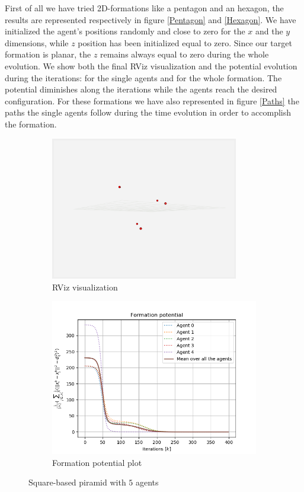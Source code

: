 \documentclass[a4paper,11pt,oneside]{book}
\begin{document}
First of all we have tried 2D-formations like a pentagon and an hexagon, the results are represented respectively in figure \ref{Pentagon} and \ref{Hexagon}. We have initialized the agent's positions randomly and close to zero for the $x$ and the $y$ dimensions, while $z$ position has been initialized equal to zero. Since our target formation is planar, the $z$ remains always equal to zero during the whole evolution.
We show both the final RViz visualization and the potential evolution during the iterations: for the single agents and for the whole formation. The potential diminishes along the iterations while the agents reach the desired configuration. 
For these formations we have also represented in figure \ref{Paths} the paths the single agents follow during the time evolution in order to accomplish the formation.

\begin{figure}
\centering
	\begin{subfigure}{0.49\textwidth}	
	\includegraphics[width=0.9\textwidth]{Task-2.2_R-viz_No-Coll-Avoid_Piramid}
	\caption{RViz visualization}
	\end{subfigure}
\hfill
	\begin{subfigure}{0.49\textwidth}	
	\includegraphics[width=\textwidth]{Formation_potential_piramid}
	\caption{Formation potential plot}
	\end{subfigure}
\caption{Square-based piramid with $5$ agents}
\label{Piramid}
\end{figure}
\end{document}
